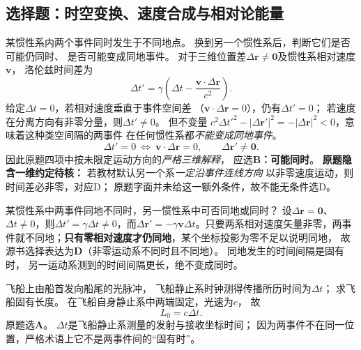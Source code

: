 
\subsection{选择题：时空变换、速度合成与相对论能量}

\problemtext 某惯性系内两个事件同时发生于不同地点。
换到另一个惯性系后，判断它们是否可能仍同时、
是否可能变成同地事件。
\workings
对于三维位置差$\Delta\bm r\ne\bm0$及惯性系相对速度$\bm v$，
洛伦兹时间差为
\[
\Delta t'=\gamma\left(\Delta t-\frac{\bm v\cdot\Delta\bm r}{c^2}\right).
\]
给定$\Delta t=0$，若相对速度垂直于事件空间差
（$\bm v\cdot\Delta\bm r=0$），仍有$\Delta t'=0$；
若速度在分离方向有非零分量，则$\Delta t'\ne0$。
但不变量
$c^2\Delta t'^2-|\Delta\bm r'|^2
=-|\Delta\bm r|^2<0$，意味着这种类空间隔的两事件
在任何惯性系都\emph{不能变成同地事件}。
\[
\boxed{\Delta t'=0\ \Longleftrightarrow\ \bm v\cdot\Delta\bm r=0},\qquad\boxed{\Delta\bm r'\ne\bm0}.
\]
因此原题四项中按未限定运动方向的\emph{严格三维解释}，
应选\textbf{B：可能同时}。
\crosscheck \textbf{原题隐含一维约定待核：}
若教材默认另一个系\emph{一定沿事件连线方向}
以非零速度运动，则时间差必非零，对应D；
原题字面并未给这一额外条件，故不能无条件选D。

\problemtext 某惯性系中两事件同地不同时，另一惯性系中可否同地或同时？
\workings
设$\Delta\bm r=\bm0$、$\Delta t\ne0$，则$\Delta t'=\gamma\Delta t\ne0$，而$\Delta\bm r'=-\gamma\bm v\Delta t$。只要两系相对速度矢量非零，两事件就不同地；\textbf{只有零相对速度才仍同地}，某个坐标投影为零不足以说明同地，
故源书选择表达为\textbf{D}（非零运动系不同时且不同地）。
\crosscheck 同地发生的时间间隔是固有时，
另一运动系测到的时间间隔更长，绝不变成同时。

\problemtext 飞船上由船首发向船尾的光脉冲，
飞船静止系时钟测得传播所历时间为$\Delta t$；
求飞船固有长度。
\workings
在飞船自身静止系中两端固定，光速为$c$，
故
\[
\boxed{L_0=c\Delta t}.
\]
原题选\textbf{A}。
\crosscheck $\Delta t$是飞船静止系测量的发射与接收坐标时间；
因为两事件不在同一位置，严格术语上它不是两事件间的“固有时”。

